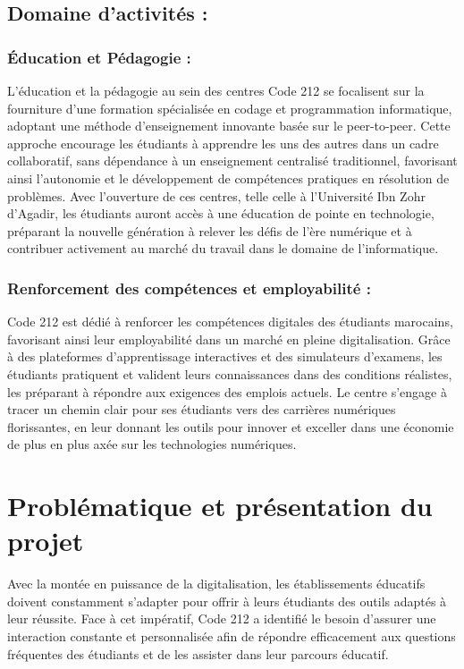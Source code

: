 \documentclass[a4paper, 11pt, openany]{report}
\begin{document}
\subsection{Domaine d'activités :}

\subsubsection{Éducation et Pédagogie :}
L'éducation et la pédagogie au sein des centres Code 212 se focalisent sur la fourniture d'une formation spécialisée en codage et programmation informatique, adoptant une méthode d'enseignement innovante basée sur le peer-to-peer. Cette approche encourage les étudiants à apprendre les uns des autres dans un cadre collaboratif, sans dépendance à un enseignement centralisé traditionnel, favorisant ainsi l'autonomie et le développement de compétences pratiques en résolution de problèmes. Avec l'ouverture de ces centres, telle celle à l'Université Ibn Zohr d'Agadir, les étudiants auront accès à une éducation de pointe en technologie, préparant la nouvelle génération à relever les défis de l'ère numérique et à contribuer activement au marché du travail dans le domaine de l'informatique.

\subsubsection{Renforcement des compétences et employabilité :}
Code 212 est dédié à renforcer les compétences digitales des étudiants marocains, favorisant ainsi leur employabilité dans un marché en pleine digitalisation. Grâce à des plateformes d'apprentissage interactives et des simulateurs d'examens, les étudiants pratiquent et valident leurs connaissances dans des conditions réalistes, les préparant à répondre aux exigences des emplois actuels. Le centre s'engage à tracer un chemin clair pour ses étudiants vers des carrières numériques florissantes, en leur donnant les outils pour innover et exceller dans une économie de plus en plus axée sur les technologies numériques.



\section{Problématique et présentation du projet}
Avec la montée en puissance de la digitalisation, les établissements éducatifs doivent constamment s'adapter pour offrir à leurs étudiants des outils adaptés à leur réussite. Face à cet impératif, Code 212 a identifié le besoin d'assurer une interaction constante et personnalisée afin de répondre efficacement aux questions fréquentes des étudiants et de les assister dans leur parcours éducatif.
\end{document}
